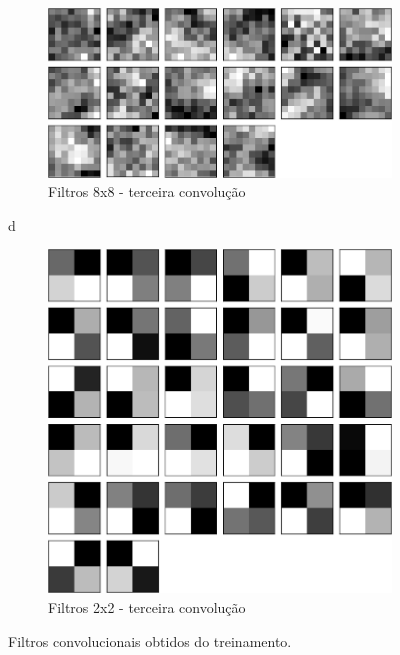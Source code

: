 \documentclass[
	12pt,				%
	oneside,			%
	a4paper,			%
	english,			%
	french,				%
	spanish,			%
	brazil,				%
	]{abntex2}
\begin{document}
\begin{figure}[h]
	\begin{subfigure}{.8\textwidth}
		\centering
		\includegraphics[width=.6\linewidth]{images/fabio/resultados/network_3/filter_convolution2d_3}%
		\caption{Filtros 8x8 - terceira convolução}		
		\label{fig:conv3_filtro}	
	\end{subfigure}%
d
	\begin{subfigure}{.8\textwidth}
	\centering
	\includegraphics[width=.6\linewidth]{images/fabio/resultados/network_3/filter_convolution2d_4}%
	\caption{Filtros 2x2 - terceira convolução}		
	\label{fig:conv4_filtro}	
\end{subfigure}%
	\label{fig:convs_filtros}
	\caption{Filtros convolucionais obtidos do treinamento.}
\end{figure}
\end{document}
